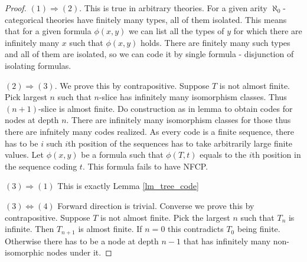 \documentclass{amsart}
\begin{document}
\begin{proof}
	$(1) \Rightarrow (2)$. This is true in arbitrary theories. For a given arity $\aleph_0$-categorical theories have finitely many types, all of them isolated. This means that for a given formula $\phi(x, y)$ we can list all the types of $y$ for which there are infinitely many $x$ such that $\phi(x, y)$ holds. There are finitely many such types and all of them are isolated, so we can code it by single formula - disjunction of isolating formulas.
	
	$(2) \Rightarrow (3)$. We prove this by contrapositive. Suppose $T$ is not almost finite. Pick largest $n$ such that $n$-slice has infinitely many isomorphism classes. Thus $(n+1)$-slice is almost finite. Do construction as in lemma to obtain codes for nodes at depth $n$. There are infinitely many isomorphism classes for those thus there are infnitely many codes realized. As every code is a finite sequence, there has to be $i$ such $i$th position of the sequences has to take arbitrarily large finite values. Let $\phi(x,y)$ be a formula such that $\phi(T, t)$ equals to the $i$th position in the sequence coding $t$. This formula fails to have NFCP.
	
	$(3) \Rightarrow (1)$ This is exactly Lemma \ref{lm_tree_code} %
	
	$(3) \Leftrightarrow (4)$ Forward direction is trivial. Converse we prove this by contrapositive. Suppose $T$ is not almost finite. Pick the largest $n$ such that $T_n$ is infinite. Then $T_{n+1}$ is almost finite. If $n=0$ this contradicts $T_0$ being finite. Otherwise there has to be a node at depth $n-1$ that has infinitely many non-isomorphic nodes under it. 
\end{proof}
\end{document}
